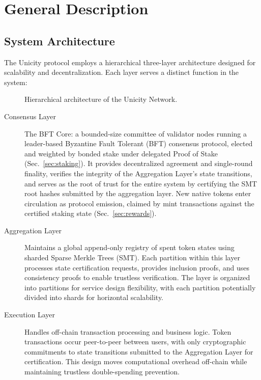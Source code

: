 \chapter{General Description}

\section{System Architecture}

The Unicity protocol employs a hierarchical three-layer architecture designed for scalability and decentralization. Each layer serves a distinct function in the system:

\begin{figure}[!htbp]
    \centering
    \caption{Hierarchical architecture of the Unicity Network.}\label{fig:unicity-layers}
\end{figure}

\begin{description}
\item[Consensus Layer] The BFT Core: a bounded-size committee of validator nodes running a leader-based Byzantine Fault Tolerant (BFT) consensus protocol, elected and weighted by bonded stake under delegated Proof of Stake (Sec.~\ref{sec:staking}). It provides decentralized agreement and single-round finality, verifies the integrity of the Aggregation Layer's state transitions, and serves as the root of trust for the entire system by certifying the SMT root hashes submitted by the aggregation layer. New native tokens enter circulation as protocol emission, claimed by mint transactions against the certified staking state (Sec.~\ref{sec:rewards}).

\item[Aggregation Layer] Maintains a global append-only registry of spent token states using sharded Sparse Merkle Trees (SMT). Each partition within this layer processes state certification requests, provides inclusion proofs, and uses consistency proofs to enable trustless verification. The layer is organized into partitions for service design flexibility, with each partition potentially divided into shards for horizontal scalability.

\item[Execution Layer] Handles off-chain transaction processing and business logic. Token transactions occur peer-to-peer between users, with only cryptographic commitments to state transitions submitted to the Aggregation Layer for certification. This design moves computational overhead off-chain while maintaining trustless double-spending prevention.
\end{description}

